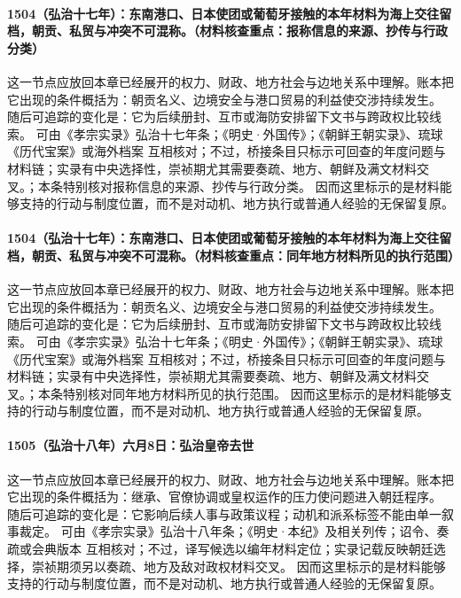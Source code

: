 \paragraph{1504（弘治十七年）：东南港口、日本使团或葡萄牙接触的本年材料为海上交往留档，朝贡、私贸与冲突不可混称。（材料核查重点：报称信息的来源、抄传与行政分类）} 这一节点应放回本章已经展开的权力、财政、地方社会与边地关系中理解。账本把它出现的条件概括为：朝贡名义、边境安全与港口贸易的利益使交涉持续发生。 随后可追踪的变化是：它为后续册封、互市或海防安排留下文书与跨政权比较线索。 可由《孝宗实录》弘治十七年条；《明史·外国传》；《朝鲜王朝实录》、琉球《历代宝案》或海外档案 互相核对；不过，桥接条目只标示可回查的年度问题与材料链；实录有中央选择性，崇祯期尤其需要奏疏、地方、朝鲜及满文材料交叉。；本条特别核对报称信息的来源、抄传与行政分类。 因而这里标示的是材料能够支持的行动与制度位置，而不是对动机、地方执行或普通人经验的无保留复原。

\paragraph{1504（弘治十七年）：东南港口、日本使团或葡萄牙接触的本年材料为海上交往留档，朝贡、私贸与冲突不可混称。（材料核查重点：同年地方材料所见的执行范围）} 这一节点应放回本章已经展开的权力、财政、地方社会与边地关系中理解。账本把它出现的条件概括为：朝贡名义、边境安全与港口贸易的利益使交涉持续发生。 随后可追踪的变化是：它为后续册封、互市或海防安排留下文书与跨政权比较线索。 可由《孝宗实录》弘治十七年条；《明史·外国传》；《朝鲜王朝实录》、琉球《历代宝案》或海外档案 互相核对；不过，桥接条目只标示可回查的年度问题与材料链；实录有中央选择性，崇祯期尤其需要奏疏、地方、朝鲜及满文材料交叉。；本条特别核对同年地方材料所见的执行范围。 因而这里标示的是材料能够支持的行动与制度位置，而不是对动机、地方执行或普通人经验的无保留复原。

\paragraph{1505（弘治十八年）六月8日：弘治皇帝去世} 这一节点应放回本章已经展开的权力、财政、地方社会与边地关系中理解。账本把它出现的条件概括为：继承、官僚协调或皇权运作的压力使问题进入朝廷程序。 随后可追踪的变化是：它影响后续人事与政策议程；动机和派系标签不能由单一叙事裁定。 可由《孝宗实录》弘治十八年条；《明史·本纪》及相关列传；诏令、奏疏或会典版本 互相核对；不过，译写候选以编年材料定位；实录记载反映朝廷选择，崇祯期须另以奏疏、地方及敌对政权材料交叉。 因而这里标示的是材料能够支持的行动与制度位置，而不是对动机、地方执行或普通人经验的无保留复原。


